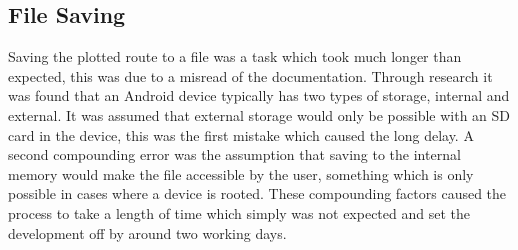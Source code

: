 \subsection{File Saving}
Saving the plotted route to a file was a task which took much longer than expected, this was due to a misread of the documentation. Through research it was found that an Android device typically has two types of storage, internal and external. It was assumed that external storage would only be possible with an SD card in the device, this was the first mistake which caused the long delay. A second compounding error was the assumption that saving to the internal memory would make the file accessible by the user, something which is only possible in cases where a device is rooted. These compounding factors caused the process to take a length of time which simply was not expected and set the development off by around two working days. 
